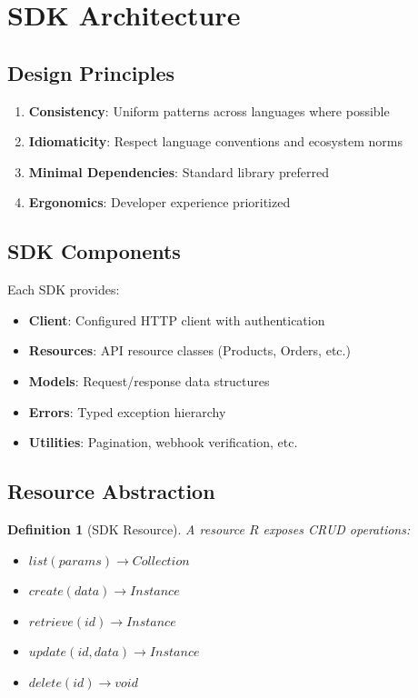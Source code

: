 \documentclass[11pt,a4paper]{article}
\newtheorem{definition}[theorem]{Definition}
\begin{document}
\section{SDK Architecture}

\subsection{Design Principles}

\begin{enumerate}
    \item \textbf{Consistency}: Uniform patterns across languages where possible
    \item \textbf{Idiomaticity}: Respect language conventions and ecosystem norms
    \item \textbf{Minimal Dependencies}: Standard library preferred
    \item \textbf{Ergonomics}: Developer experience prioritized
\end{enumerate}

\subsection{SDK Components}

Each SDK provides:

\begin{itemize}
    \item \textbf{Client}: Configured HTTP client with authentication
    \item \textbf{Resources}: API resource classes (Products, Orders, etc.)
    \item \textbf{Models}: Request/response data structures
    \item \textbf{Errors}: Typed exception hierarchy
    \item \textbf{Utilities}: Pagination, webhook verification, etc.
\end{itemize}

\subsection{Resource Abstraction}

\begin{definition}[SDK Resource]
A resource $R$ exposes CRUD operations:
\begin{itemize}
    \item $list(params) \rightarrow Collection$
    \item $create(data) \rightarrow Instance$
    \item $retrieve(id) \rightarrow Instance$
    \item $update(id, data) \rightarrow Instance$
    \item $delete(id) \rightarrow void$
\end{itemize}
\end{definition}
\end{document}

